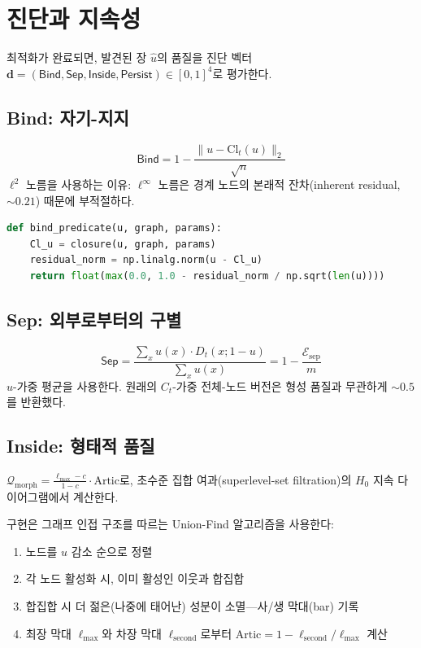 \section{진단과 지속성}
\label{sec:diagnostics-impl}

최적화가 완료되면, 발견된 장 $\hat{u}$의 품질을 진단 벡터 $\mathbf{d} = (\mathsf{Bind}, \mathsf{Sep}, \mathsf{Inside}, \mathsf{Persist}) \in [0,1]^4$로 평가한다.

\subsection{Bind: 자기-지지}

\begin{equation}
    \mathsf{Bind} = 1 - \frac{\|u - \mathrm{Cl}_t(u)\|_2}{\sqrt{n}}
\end{equation}
$\ell^2$ 노름을 사용하는 이유: $\ell^\infty$ 노름은 경계 노드의 본래적 잔차(inherent residual, $\sim 0.21$) 때문에 부적절하다.

\begin{lstlisting}[language=Python, caption={Bind 진단 (diagnostics.py)}]
def bind_predicate(u, graph, params):
    Cl_u = closure(u, graph, params)
    residual_norm = np.linalg.norm(u - Cl_u)
    return float(max(0.0, 1.0 - residual_norm / np.sqrt(len(u))))
\end{lstlisting}

\subsection{Sep: 외부로부터의 구별}

\begin{equation}
    \mathsf{Sep} = \frac{\sum_x u(x) \cdot D_t(x; 1{-}u)}{\sum_x u(x)} = 1 - \frac{\mathcal{E}_{\mathrm{sep}}}{m}
\end{equation}
$u$-가중 평균을 사용한다. 원래의 $C_t$-가중 전체-노드 버전은 형성 품질과 무관하게 $\sim 0.5$를 반환했다.

\subsection{Inside: 형태적 품질}

$\mathcal{Q}_{\mathrm{morph}} = \frac{\ell_{\max} - c}{1 - c} \cdot \mathrm{Artic}$로, 초수준 집합 여과(superlevel-set filtration)의 $H_0$ 지속 다이어그램에서 계산한다.

구현은 그래프 인접 구조를 따르는 Union-Find 알고리즘을 사용한다:
\begin{enumerate}
    \item 노드를 $u$ 감소 순으로 정렬
    \item 각 노드 활성화 시, 이미 활성인 이웃과 합집합
    \item 합집합 시 더 젊은(나중에 태어난) 성분이 소멸---사/생 막대(bar) 기록
    \item 최장 막대 $\ell_{\max}$와 차장 막대 $\ell_{\mathrm{second}}$로부터 $\mathrm{Artic} = 1 - \ell_{\mathrm{second}}/\ell_{\max}$ 계산
\end{enumerate}

